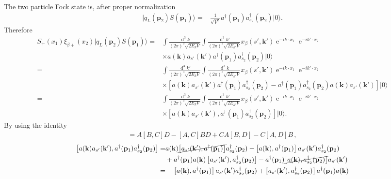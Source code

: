 The two particle Fock state is, after proper normalization
\begin{align}
  |q_L(\mathbf{p}_2)S(\mathbf{p}_1)\rangle=&\frac{1}{\sqrt{V^2}}a^\dagger(\mathbf{p}_1)a_{s_2}^\dagger(\mathbf{p}_2)|0\rangle.
\end{align}
Therefore
\begin{align}
  S_{+}(x_1)\xi_{\beta +}(x_2)|q_L(\mathbf{p}_2)S(\mathbf{p}_1)\rangle   =&
\int\frac{\operatorname{d}^3k}{(2\pi)^3\sqrt{2E_k V}}\int\frac{\operatorname{d}^3k'}{(2\pi)^3\sqrt{2E_{k'}V}}
x_\beta(s',\mathbf{k}')\operatorname{e}^{-i k\cdot x_1}\operatorname{e}^{-i k'\cdot x_2}\nonumber\\
&\times a(\mathbf{k})a_{s'}(\mathbf{k}')a^\dagger(\mathbf{p}_1)a_{s_2}^\dagger(\mathbf{p}_2)|0\rangle \nonumber\\
=&
\int\frac{\operatorname{d}^3k'}{(2\pi)^3\sqrt{2E_k V}}\int\frac{\operatorname{d}^3k}{(2\pi)^3\sqrt{2E_{k'}V}}
x_\beta(s',\mathbf{k}')\operatorname{e}^{-i k\cdot x_1}\operatorname{e}^{-i k'\cdot x_2}\nonumber\\
&\times \left[ a(\mathbf{k})a_{s'}(\mathbf{k}')a^\dagger(\mathbf{p}_1)a_{s_2}^\dagger(\mathbf{p}_2) - a^\dagger(\mathbf{p}_1)a_{s_2}^\dagger(\mathbf{p}_2) a(\mathbf{k})a_{s'}(\mathbf{k}') \right]|0\rangle \nonumber\\
=&
\int\frac{\operatorname{d}^3k}{(2\pi)^3\sqrt{2E_k V}}\int\frac{\operatorname{d}^3k'}{(2\pi)^3\sqrt{2E_{k'}V}}
x_\beta(s',\mathbf{k}')\operatorname{e}^{-i k\cdot x_1}\operatorname{e}^{-i k'\cdot x_2}\nonumber\\
&\times \left[ a(\mathbf{k})a_{s'}(\mathbf{k}'),a^\dagger(\mathbf{p}_1)a_{s_2}^\dagger(\mathbf{p}_2)\right]|0\rangle.
\end{align}
By using the identity
\begin{align}
  [AB,CD]=A[B,C]D - [A,C]BD
+CA[B, D] - C[A, D]B\,,
\end{align}
\begin{align}
   \left[ a(\mathbf{k})a_{s'}(\mathbf{k}'),a^\dagger(\mathbf{p}_1)a_{s_2}^\dagger(\mathbf{p}_2)\right]=&
 a(\mathbf{k})\cancel{\left[ a_{s'}(\mathbf{k}'),a^\dagger(\mathbf{p}_1)\right]}a_{s_2}^\dagger(\mathbf{p}_2)
-
 \left[ a(\mathbf{k}),a^\dagger(\mathbf{p}_1)\right]a_{s'}(\mathbf{k}')a_{s_2}^\dagger(\mathbf{p}_2) \nonumber\\
& 
+a^\dagger(\mathbf{p}_1)a(\mathbf{k})\left[ a_{s'}(\mathbf{k}'),a_{s_2}^\dagger(\mathbf{p}_2)\right]
-
a^\dagger(\mathbf{p}_1) \cancel{\left[ a(\mathbf{k}),a_{s_2}^\dagger(\mathbf{p}_2)\right]}a_{s'}(\mathbf{k}') \nonumber\\
=&
-
 \left[ a(\mathbf{k}),a^\dagger(\mathbf{p}_1)\right]a_{s'}(\mathbf{k}')a_{s_2}^\dagger(\mathbf{p}_2)  
+\left[ a_{s'}(\mathbf{k}'),a_{s_2}^\dagger(\mathbf{p}_2)\right]a^\dagger(\mathbf{p}_1)a(\mathbf{k})
\end{align}
